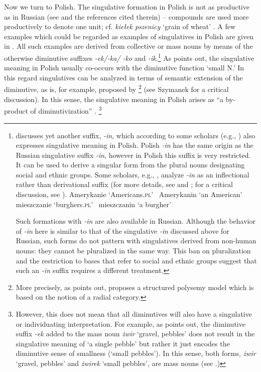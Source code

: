 \documentclass[output=paper,colorlinks,citecolor=brown,
]{langscibook}
\begin{document}
Now we turn to Polish. The singulative formation in Polish is not as productive as in Russian (see \citealt{Szymanek2014} and the references cited therein) -- compounds are used more productively to denote one unit; cf. \textit{kiełek pszenicy} `grain of wheat' \citep[863]{GunkelZifonun2017}. A few examples which could be regarded as examples of singulatives in Polish are given in . All such examples are derived from collective or mass nouns by means of the otherwise diminutive suffixes \textit{-ek/-ka/ -ko} and \textit{-ik}.\footnote{\citet{Szymanek2014} discusses yet another suffix, \textit{-in}, which according to some scholars (e.g., \citealt{Wierzbicka2002}) also expresses singulative meaning in Polish. Polish \textit{-in} has the same origin as the Russian singulative suffix \textit{-in}, however in Polish this suffix is very restricted. It can be used to derive a singular form from the plural nouns designating social and ethnic groups. Some scholars, e.g., \citet{GrzegorczykowaWrobel1999}, analyze \textit{-in} as an inflectional rather than derivational suffix (for more details, see \citealt{GrzegorczykowaWrobel1999} and \citealt{Orzechowska1999}; for a critical discussion, see \citealt{Szymanek2014}).
\ea 
\ea	Amerykanie `Americans.\textsc{pl}' \rightarrow \ Amerykanin `an American' 
\ex mieszczanie `burghers.\textsc{pl}' \rightarrow \ mieszczanin `a burgher' 
\z\z

\noindent Such formations with \textit{-in} are also available in Russian. Although the behavior of \textit{-in} here is similar to that of the singulative \textit{-in} discussed above for Russian, such forms do not pattern with singulatives derived from non-human nouns: they cannot be pluralized in the same way. This ban on pluralization and the restriction to bases that refer to social and ethnic groups suggest that such an \textit{-in} suffix requires a different treatment.} As \citet{Szymanek2014} points out, the singulative meaning in Polish usually co-occurs with the diminutive function `small N.' In this regard singulatives can be analyzed in terms of semantic extension of the diminutive, as is, for example, proposed by \citet{Jurafsky1996}\footnote{More precisely, as \citet{Szymanek2014} points out, \citet{Jurafsky1996} proposes a structured polysemy model which is based on the notion of a radial category.} (see Szymanek for a critical discussion). In this sense, the singulative meaning in Polish arises as ``a by-product of diminutivization'' \citep{Szymanek2014}. \footnote{However, this does not mean that all diminutives will also have a singulative or individuating interpretation. For example, as \citet{Szymanek2014} points out, the diminutive suffix \textit{-ek} added to the mass noun \textit{żwir} `gravel, pebbles' does not result in the singulative meaning of `a single pebble' but rather it just encodes the diminutive sense of smallness (`small pebbles'). In this sense, both forms, \textit{żwir} `gravel, pebbles' and \textit{żwirek} `small pebbles', are mass nouns (see \citealt{Szymanek2014}.)}
\end{document}
